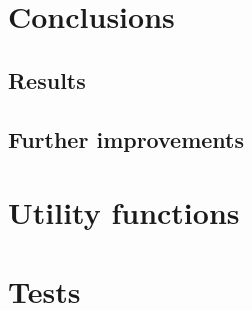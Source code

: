 \documentclass[11pt,oneside]{article}	%
\begin{document}
\section{Conclusions}\label{sec:conclusions}
\subsection{Results}

\subsection{Further improvements}



\appendix
\section{Utility functions}


\section{Tests}\label{sec:tests}
\end{document}
